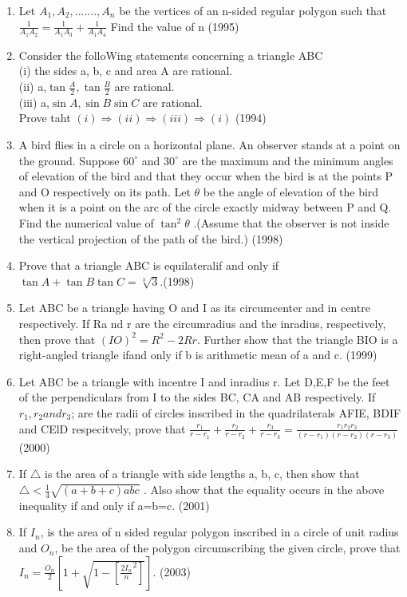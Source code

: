 \documentclass[12pt]{article}
\providecommand{\sbrak}[1]{\ensuremath{{}\left[#1\right]}}
\begin{document}
\begin{enumerate}
\item Let $A_1,A_2,.......,A_n$ be the vertices of an n-sided regular polygon such that 
$\frac{1}{A_1A_2}=\frac{1}{A_1A_3}+\frac{1}{A_1A_4}$ Find the value of n (1995)
\item Consider the folloWing statements concerning a triangle ABC\\
(i) the sides a, b, c and area A are rational.\\
(ii) a,$\tan \frac{A}{2},\tan \frac{B}{2}$ are rational.\\
(iii) a,$\sin A,\sin B \sin C$ are rational.\\
Prove taht $(i)\Rightarrow(ii)\Rightarrow(iii)\Rightarrow(i)$  (1994)
\item A bird flies in a circle on a horizontal plane. An observer stands at a point on the ground. Suppose $60^\circ$ and $30^\circ$ are the maximum and the minimum angles of elevation of the bird and that they occur when the bird is at the points P and O respectively on its path. Let $\theta$ be the angle of elevation of the bird when it is a point on the arc of the circle exactly midway between P and Q. Find the numerical value of $\tan^2\theta$ .(Assume that the observer is not inside the vertical projection of the path of the bird.) (1998)
\item Prove that a triangle ABC is equilateralif and only if $\tan A +\tan B\tan C =\sqrt[3]{3}$.(1998)
\item Let ABC be a triangle having O and I as its circumcenter and in centre respectively. If Ra nd r are the circumradius and the inradius, respectively, then prove that $(IO)^2=R^2-2Rr$. Further show that the triangle BIO is a right-angled triangle
ifand only if b is arithmetic mean of a and c. (1999)
\item Let ABC be a triangle with incentre I and inradius r. Let D,E,F be the feet of the perpendiculars from I to the sides BC, CA and AB respectively. If $r_1,r_2 and r_3$; are the radii of circles inscribed in the quadrilaterals AFIE, BDIF and CElD respecitvely, prove that $\frac{r_1}{r-r_1}+\frac{r_2}{r-r_2}+\frac{r_3}{r-r_3}=\frac{r_1r_2r_3}{(r-r_1)(r-r_2)(r-r_3)}$ (2000)
\item If $\triangle$ is the area of a triangle with side lengths a, b, c, then show that $\triangle<\frac{1}{4}\sqrt{(a+b+c)abc}$ . Also show that the equality occurs in the above inequality if and only if a=b=c. (2001)
\item If $I_n$, is the area of n sided regular polygon inscribed in a circle of unit radius and $O_n$, be the area of the polygon circumscribing the given circle, prove that $I_n=\frac{O_n}{2}\sbrak{1+\sqrt{1-\sbrak{\frac{2I_n}{n}^2}}}$. (2003)


\end{enumerate}
\end{document}
